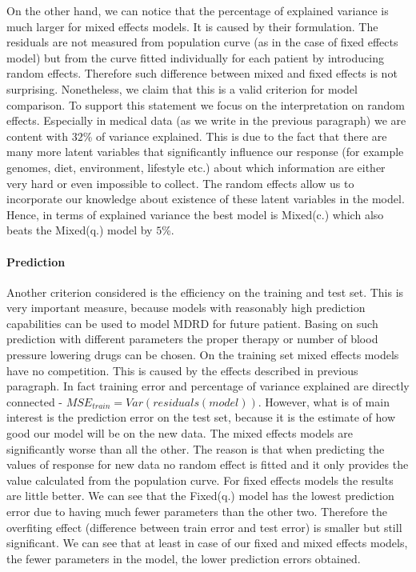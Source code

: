 \documentclass[num-refs]{wiley-article}
\begin{document}
On the other hand, we can notice that the percentage of explained variance is much larger for mixed effects models. It is caused by their formulation. The residuals are not measured from population curve (as in the case of fixed effects model) but from the curve fitted individually for each patient by introducing random effects. Therefore such difference between mixed and fixed effects is not surprising. Nonetheless, we claim that this is a valid criterion for model comparison. To support this statement we focus on the interpretation on random effects. Especially in medical data (as we write in the previous paragraph) we are content with $32$\% of variance explained. This is due to the fact that there are many more latent variables that significantly influence our response (for example genomes, diet, environment, lifestyle etc.) about which information are either very hard or even impossible to collect. The random effects allow us to incorporate our knowledge about existence of these latent variables in the model. Hence, in terms of explained variance the best model is Mixed(c.) which also beats the Mixed(q.) model by $5$\%. 
\paragraph{Prediction}
Another criterion considered is the efficiency on the training and test set. This is very important measure, because models with reasonably high prediction capabilities can be used to model MDRD for future patient. Basing on such prediction with different parameters the proper therapy or number of blood pressure lowering drugs can be chosen. On the training set mixed effects models have no competition. This is caused by the effects described in previous paragraph. In fact training error and percentage of variance explained are directly connected - $MSE_{train} = Var(residuals(model))$. However, what is of main interest is the prediction error on the test set, because it is the estimate of how good our model will be on the new data. The mixed effects models are significantly worse than all the other. The reason is that when predicting the values of response for new data no random effect is fitted and it only provides the value calculated from the population curve. For fixed effects models the results are little better. We can see that the Fixed(q.) model has the lowest prediction error due to having much fewer parameters than the other two. Therefore the overfiting effect (difference between train error and test error) is smaller but still significant. We can see that at least in case of our fixed and mixed effects models, the fewer parameters in the model, the lower prediction errors obtained. 
\end{document}
